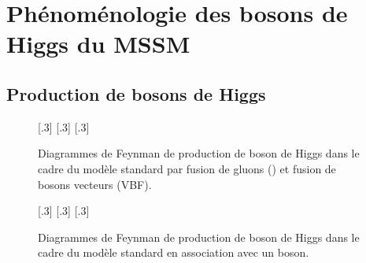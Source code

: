 \section{Phénoménologie des bosons de Higgs du MSSM}
\subsection{Production de bosons de Higgs}

\begin{figure}[h]
\centering
\vspace{\baselineskip}
[.3\textwidth]
{\vspace{\baselineskip}}
\hfill
{}[.3\textwidth]
{\vspace{\baselineskip}}
\hfill
{}[.3\textwidth]
{\vspace{\baselineskip}}
\caption{Diagrammes de Feynman de production de boson de Higgs dans le cadre du modèle standard par fusion de gluons (\gluon\gluon\higgs) et fusion de bosons vecteurs (VBF).}
\label{fig-fgraph-Higgs_prod_ggh_VBF}
\end{figure}

\begin{figure}[h]
\centering
\vspace{\baselineskip}
[.3\textwidth]
{\vspace{\baselineskip}}
\hfill
{}[.3\textwidth]
{\vspace{\baselineskip}}
\hfill
{}[.3\textwidth]
{\vspace{\baselineskip}}
\caption{Diagrammes de Feynman de production de boson de Higgs dans le cadre du modèle standard en association avec un boson.}
\label{fig-fgraph-Higgs_prod_VH_ggZh}
\end{figure}

